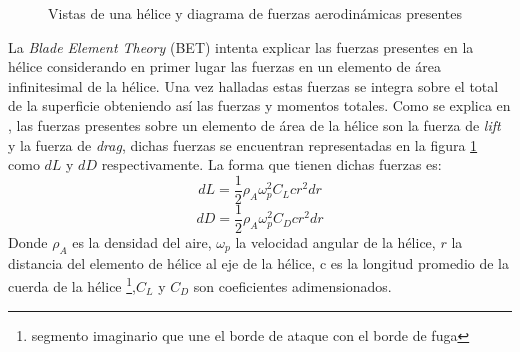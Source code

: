\documentclass[main]{subfiles}
\begin{document}
\begin{figure} [h!]
  \centering
  \vspace{-25pt}
  \caption{Vistas de una h\'elice y diagrama de fuerzas aerodin\'amicas presentes}
  \label{fig:helice}
\end{figure}

La \emph{Blade Element Theory} (BET) intenta explicar las fuerzas presentes en la h\'elice considerando en primer lugar las fuerzas en un elemento de \'area infinitesimal de la h\'elice. Una vez halladas estas fuerzas se integra sobre el total de la superficie obteniendo as\'i las fuerzas y momentos totales. Como se explica en \cite{bib:fuerzas-helices}, las fuerzas presentes sobre un elemento de \'area de la h\'elice son la fuerza de \emph{lift} y la fuerza de \emph{drag}, dichas fuerzas se encuentran representadas en la figura \ref{fig:helice} como $dL$ y $dD$ respectivamente. La forma que tienen dichas fuerzas es:
\begin{equation}
dL=\frac{1}{2}\rho_A \omega_p^2 C_L c r^2dr
\end{equation}
\begin{equation}
dD=\frac{1}{2}\rho_A \omega_p^2 C_D c r^2dr
\end{equation}
Donde $\rho_A$ es la densidad del aire, $\omega_p$ la velocidad angular de la h\'elice, $r$ la distancia del elemento de h\'elice al eje de la h\'elice, c es la longitud promedio de la cuerda de la h\'elice \footnote{segmento imaginario que une el borde de ataque con el borde de fuga},$ C_L$ y $C_D$ son coeficientes adimensionados.
\end{document}
